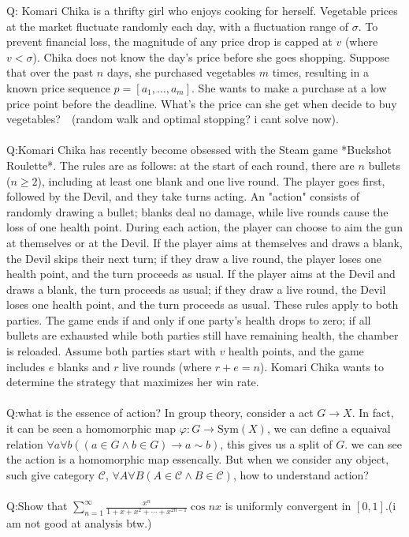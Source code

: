 \documentclass[10pt,a4paper]{article}
\begin{document}
Q: Komari Chika is a thrifty girl who enjoys cooking for herself. 
Vegetable prices at the market fluctuate randomly each day, with a fluctuation range of $\sigma$. 
To prevent financial loss, the magnitude of any price drop is capped at $v$ (where $v < \sigma$). 
Chika does not know the day's price before she goes shopping. 
Suppose that over the past $n$ days, she purchased vegetables $m$ times, resulting in a known price sequence $p = [a_1, \dots, a_m]$. 
She wants to make a purchase at a low price point before the deadline. What's the price can she get when decide to buy vegetables?$\quad$(random walk and optimal stopping? i cant solve now).
\\
\\
Q:Komari Chika has recently become obsessed with the Steam game *Buckshot Roulette*. The rules are as follows: at the start of each round, 
there are $n$ bullets ($n \ge 2$), including at least one blank and one live round. 
The player goes first, followed by the Devil, and they take turns acting. An "action" consists of randomly drawing a bullet; blanks deal no damage, while live rounds cause the loss of one health point. During each action, 
the player can choose to aim the gun at themselves or at the Devil. If the player aims at themselves and draws a blank, the Devil skips their next turn; if they draw a live round, the player loses one health point, 
and the turn proceeds as usual. If the player aims at the Devil and draws a blank, the turn proceeds as usual; if they draw a live round, the Devil loses one health point, and the turn proceeds as usual. 
These rules apply to both parties. The game ends if and only if one party's health drops to zero; if all bullets are exhausted while both parties still have remaining health, the chamber is reloaded.
Assume both parties start with $v$ health points, and the game includes $e$ blanks and $r$ live rounds (where $r + e = n$). Komari Chika wants to determine the strategy that maximizes her win rate.
\\
\\
Q:what is the essence of action? In group theory, consider a act $G\to X$. In fact, it can be seen a homomorphic map $\varphi:G\to\mathrm{Sym}(X)$, 
we can define a equaival relation $\forall a\forall b((a\in G\land b\in G)\rightarrow a\sim b)$, this gives us a split of $G$. we can see the action is a homomorphic map essencally.
But when we consider any object, such give category $\mathcal{C}$, $\forall A\forall B(A\in\mathcal{C}\land B\in\mathcal{C})$, how to understand action?
\\
\\
Q:Show that $\sum\limits_{n=1}^{\infty}\frac{x^n}{1+x+x^2+\cdots+x^{2n-1}}\cos nx$ is uniformly convergent in $[0,1]$.(i am not good at analysis btw.)
\end{document}
